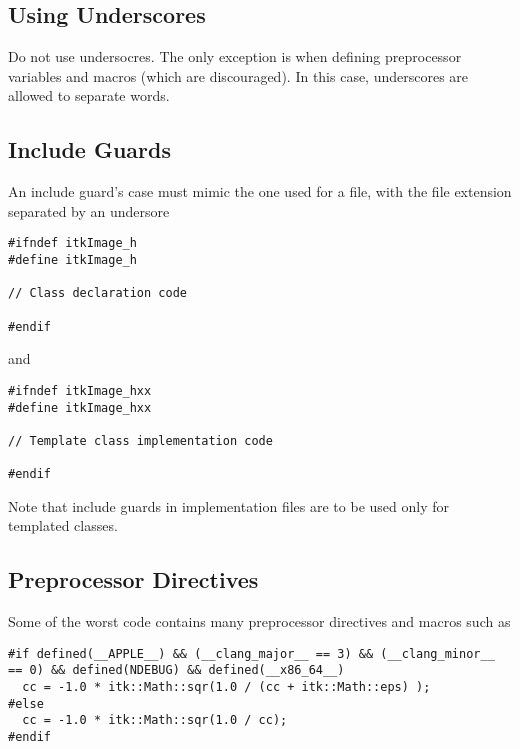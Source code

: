 \subsection{Using Underscores}
\label{subsec:UsingUnderscores}

Do not use undersocres. The only exception is when defining preprocessor
variables and macros (which are discouraged). In this case, underscores are
allowed to separate words.


\subsection{Include Guards}
\label{subsec:Include Guards}

An include guard's case must mimic the one used for a file, with the file
extension separated by an undersore

\small
\begin{verbatim}
#ifndef itkImage_h
#define itkImage_h

// Class declaration code

#endif
\end{verbatim}
\normalsize

and

\small
\begin{verbatim}
#ifndef itkImage_hxx
#define itkImage_hxx

// Template class implementation code

#endif
\end{verbatim}
\normalsize

Note that include guards in implementation files are to be used only for templated classes.


\subsection{Preprocessor Directives}
\label{subsec:PreprocessorDirectives}

Some of the worst code contains many preprocessor directives and macros such as

\small
\begin{verbatim}
#if defined(__APPLE__) && (__clang_major__ == 3) && (__clang_minor__ == 0) && defined(NDEBUG) && defined(__x86_64__)
  cc = -1.0 * itk::Math::sqr(1.0 / (cc + itk::Math::eps) );
#else
  cc = -1.0 * itk::Math::sqr(1.0 / cc);
#endif
\end{verbatim}
\normalsize

